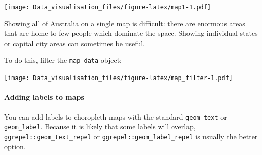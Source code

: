 \documentclass[]{book}
\newenvironment{Shaded}{\begin{snugshade}}{\end{snugshade}}
\newcommand{\CharTok}[1]{\textcolor[rgb]{0.31,0.60,0.02}{#1}}
\newcommand{\DataTypeTok}[1]{\textcolor[rgb]{0.13,0.29,0.53}{#1}}
\newcommand{\DecValTok}[1]{\textcolor[rgb]{0.00,0.00,0.81}{#1}}
\newcommand{\KeywordTok}[1]{\textcolor[rgb]{0.13,0.29,0.53}{\textbf{#1}}}
\newcommand{\NormalTok}[1]{#1}
\newcommand{\OperatorTok}[1]{\textcolor[rgb]{0.81,0.36,0.00}{\textbf{#1}}}
\newcommand{\OtherTok}[1]{\textcolor[rgb]{0.56,0.35,0.01}{#1}}
\newcommand{\StringTok}[1]{\textcolor[rgb]{0.31,0.60,0.02}{#1}}
\let\oldparagraph\paragraph
\renewcommand{\paragraph}[1]{\oldparagraph{#1}\mbox{}}
\begin{document}
\texttt{[image: Data\_visualisation\_files/figure-latex/map1-1.pdf]}

Showing all of Australia on a single map is difficult: there are enormous areas that are home to few people which dominate the space. Showing individual states or capital city areas can sometimes be useful.

To do this, filter the \texttt{map\_data} object:

\begin{Shaded}
\end{Shaded}

\texttt{[image: Data\_visualisation\_files/figure-latex/map\_filter-1.pdf]}

\hypertarget{adding-labels-to-maps}{%
\paragraph{Adding labels to maps}\label{adding-labels-to-maps}}

You can add labels to choropleth maps with the standard \texttt{geom\_text} or \texttt{geom\_label}. Because it is likely that some labels will overlap, \texttt{ggrepel::geom\_text\_repel} or \texttt{ggrepel::geom\_label\_repel} is usually the better option.
\end{document}
